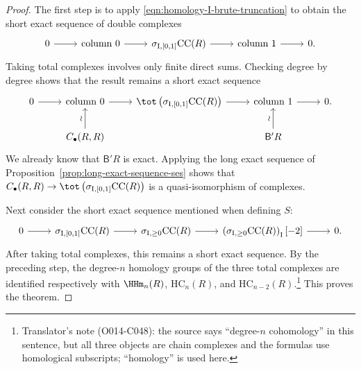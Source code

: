 \begin{proof}
	The first step is to apply \eqref{eqn:homology-I-brute-truncation} to
	obtain the short exact sequence of double complexes
	\[\begin{tikzcd}
		0 \arrow[r] & \text{column $0$} \arrow[r]
		& \sigma_{\mathrm{I},[0,1]}\mathrm{CC}(R) \arrow[r]
		& \text{column $1$} \arrow[r] & 0 .
	\end{tikzcd}\]
	Taking total complexes involves only finite direct sums. Checking degree
	by degree shows that the result remains a short exact sequence
	\[\begin{tikzcd}
		0 \arrow[r] & \text{column $0$} \arrow[r]
		& \tot\left(\sigma_{\mathrm{I},[0,1]}\mathrm{CC}(R)\right)
		\arrow[r] & \text{column $1$} \arrow[r] & 0.\\
		& C_\bullet(R,R) \arrow[u,"\sim" sloped]
		& & \mathsf{B}'R \arrow[u,"\sim" sloped] &
	\end{tikzcd}\]
	We already know that $\mathsf{B}'R$ is exact. Applying the long exact
	sequence of Proposition~\ref{prop:long-exact-sequence-ses} shows that
	$C_\bullet(R,R)\to
	\tot\left(\sigma_{\mathrm{I},[0,1]}\mathrm{CC}(R)\right)$ is a
	quasi-isomorphism of complexes.

	Next consider the short exact sequence mentioned when defining $S$:
	\[\begin{tikzcd}
		0 \arrow[r] & \sigma_{\mathrm{I},[0,1]}\mathrm{CC}(R) \arrow[r]
		& \sigma_{\mathrm{I},\geq0}\mathrm{CC}(R) \arrow[r]
		& \left(\sigma_{\mathrm{I},\geq0}\mathrm{CC}(R)\right)_{\mathrm{I}}[-2]
		\arrow[r] & 0 .
	\end{tikzcd}\]
	After taking total complexes, this remains a short exact sequence. By the
	preceding step, the degree-$n$ homology groups of the three total complexes
	are identified respectively with $\HHm_n(R)$, $\mathrm{HC}_n(R)$, and
	$\mathrm{HC}_{n-2}(R)$.\footnote{Translator's note (O014-C048): the
	source says ``degree-$n$ cohomology'' in this sentence, but all three
	objects are chain complexes and the formulas use homological subscripts;
	``homology'' is used here.} This proves the theorem.
\end{proof}


